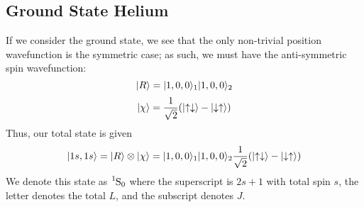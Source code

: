 \subsection{Ground State Helium}
If we consider the ground state, we see that the only non-trivial position wavefunction is the symmetric case; as such, we must have the anti-symmetric spin wavefunction:
\[\lvert R\rangle = \lvert1,0,0\rangle_1\lvert1,0,0\rangle_2\]
\[\lvert\chi\rangle = \frac{1}{\sqrt{2}}(\lvert\uparrow\downarrow\rangle-\lvert\downarrow\uparrow\rangle)\]
Thus, our total state is given
\begin{equation}
	\lvert1s,1s\rangle =\lvert R\rangle\otimes\lvert\chi\rangle = \lvert1,0,0\rangle_1\lvert1,0,0\rangle_2\frac{1}{\sqrt{2}}(\lvert\uparrow\downarrow\rangle-\lvert\downarrow\uparrow\rangle)
\end{equation}
We denote this state as \(\ce{^{1}S_0}\) where the superscript is \(2s+1\) with total spin \(s\), the letter denotes the total \(L\), and the subscript denotes \(J\). 

